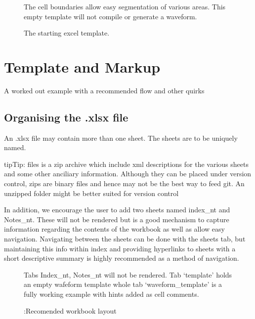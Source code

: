 \documentclass[letterpaper,10pt,english]{sphinxmanual}
\begin{document}
\begin{figure}[htbp]
\centering
\capstart

\noindent{}
\caption{The starting excel template.}
\begin{sphinxlegend}
The cell boundaries allow easy segmentation of various areas. This empty
template will not compile or generate a waveform.
\end{sphinxlegend}
\label{\detokenize{intro:id3}}\end{figure}


\chapter{Template and Markup}
\label{\detokenize{walkthrough::doc}}\label{\detokenize{walkthrough:template-and-markup}}\label{\detokenize{walkthrough:walkthrough}}
A worked out example with a recommended flow and other quirks


\section{Organising the .xlsx file}
\label{\detokenize{walkthrough:organising-the-xlsx-file}}
An .xlsx file may contain more than one sheet. The sheets are to be uniquely named.

\begin{sphinxadmonition}{tip}{Tip:}
 files is a zip archive which include xml descriptions for the various
sheets and some other anciliary information. Although they can be placed under
version control, zips are binary files and hence may not be the best
way to feed git. An unzipped folder might be better suited for version
control
\end{sphinxadmonition}

In addition, we encourage the user to add two sheets named index\_nt and
Notes\_nt. These will not be rendered but is a good mechanism to capture
information regarding the contents of the workbook as well as allow easy
navigation. Navigating between the sheets can be done with the sheets tab, but
maintaining this info within index and providing hyperlinks to sheets with a
short descriptive summary is highly recommended as a method of navigation.

\begin{figure}[htbp]
\centering
\capstart

\noindent{}
\caption{:Recomended workbook layout}
\begin{sphinxlegend}
Tabs Index\_nt, Notes\_nt will not be rendered. Tab ‘template’ holds an empty
wafeform template whole tab  ‘waveform\_template’ is a fully working example with
hints added as cell comments.
\end{sphinxlegend}
\label{\detokenize{walkthrough:id1}}\end{figure}
\end{document}

